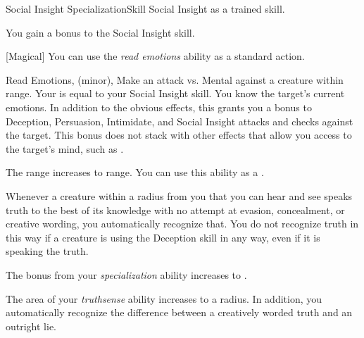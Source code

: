     \begin{feat}{Social Insight Specialization}{Skill}
        \featpre Social Insight as a trained skill.

         You gain a  bonus to the Social Insight skill.

        [Magical] You can use the \textit{read emotions} ability as a standard action.
        \begin{sustainability}{Read Emotions}{,  (minor), }
            \rankline
            Make an attack vs. Mental against a creature within \rngshort range.
            Your  is equal to your Social Insight skill.
            \hit You know the target's current emotions.
            In addition to the obvious effects, this grants you a  bonus to Deception, Persuasion, Intimidate, and Social Insight attacks and checks against the target.
            This bonus does not stack with other effects that allow you access to the target's mind, such as .

            \rankline
             The range increases to \rnglong range.
             You can use this ability as a .
        \end{sustainability}

         Whenever a creature within a \arealarge radius  from you that you can hear and see speaks truth to the best of its knowledge with no attempt at evasion, concealment, or creative wording, you automatically recognize that.
        You do not recognize truth in this way if a creature is using the Deception skill in any way, even if it is speaking the truth.

         The bonus from your \textit{specialization} ability increases to .

         The area of your \textit{truthsense} ability increases to a \gargarea radius.
        In addition, you automatically recognize the difference between a creatively worded truth and an outright lie.
    \end{feat}


